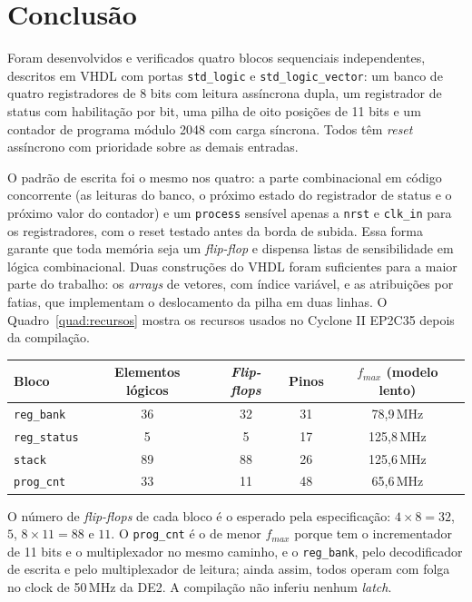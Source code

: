 \chapter{Conclusão}
\label{cap:conclusao}

Foram desenvolvidos e verificados quatro blocos sequenciais independentes, descritos em VHDL com portas \texttt{std\_logic} e \texttt{std\_logic\_vector}: um banco de quatro registradores de 8 bits com leitura assíncrona dupla, um registrador de status com habilitação por bit, uma pilha de oito posições de 11 bits e um contador de programa módulo 2048 com carga síncrona. Todos têm \textit{reset} assíncrono com prioridade sobre as demais entradas.

O padrão de escrita foi o mesmo nos quatro: a parte combinacional em código concorrente (as leituras do banco, o próximo estado do registrador de status e o próximo valor do contador) e um \texttt{process} sensível apenas a \texttt{nrst} e \texttt{clk\_in} para os registradores, com o reset testado antes da borda de subida. Essa forma garante que toda memória seja um \textit{flip-flop} e dispensa listas de sensibilidade em lógica combinacional. Duas construções do VHDL foram suficientes para a maior parte do trabalho: os \textit{arrays} de vetores, com índice variável, e as atribuições por fatias, que implementam o deslocamento da pilha em duas linhas. O Quadro~\ref{quad:recursos} mostra os recursos usados no Cyclone II EP2C35 depois da compilação.

\begin{quadro}[htb]
  \caption{Recursos e \textit{timing} de cada bloco no Cyclone II EP2C35F672C6, com clock de 50\,MHz.}
  \label{quad:recursos}
  \centering
  \begin{tabular}{lcccc}
    \hline
    Bloco & Elementos lógicos & \textit{Flip-flops} & Pinos & $f_{max}$ (modelo lento) \\ \hline
    \texttt{reg\_bank}   & 36 & 32 & 31 & 78,9\,MHz \\
    \texttt{reg\_status} & 5  & 5  & 17 & 125,8\,MHz \\
    \texttt{stack}       & 89 & 88 & 26 & 125,6\,MHz \\
    \texttt{prog\_cnt}   & 33 & 11 & 48 & 65,6\,MHz \\ \hline
  \end{tabular}
\end{quadro}

O número de \textit{flip-flops} de cada bloco é o esperado pela especificação: $4 \times 8 = 32$, $5$, $8 \times 11 = 88$ e $11$. O \texttt{prog\_cnt} é o de menor $f_{max}$ porque tem o incrementador de 11 bits e o multiplexador no mesmo caminho, e o \texttt{reg\_bank}, pelo decodificador de escrita e pelo multiplexador de leitura; ainda assim, todos operam com folga no clock de 50\,MHz da DE2. A compilação não inferiu nenhum \textit{latch}.

